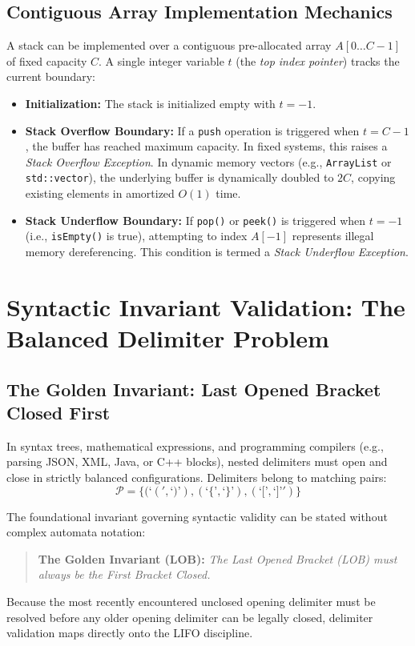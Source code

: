\documentclass[10pt,journal,compsoc,onecolumn]{IEEEtran}
\begin{document}
\subsection{Contiguous Array Implementation Mechanics}

A stack can be implemented over a contiguous pre-allocated array $A[0 \dots C-1]$ of fixed capacity $C$. A single integer variable $t$ (the \emph{top index pointer}) tracks the current boundary:
\begin{itemize}
    \item \textbf{Initialization:} The stack is initialized empty with $t = -1$.
    \item \textbf{Stack Overflow Boundary:} If a \texttt{push} operation is triggered when $t = C - 1$, the buffer has reached maximum capacity. In fixed systems, this raises a \emph{Stack Overflow Exception}. In dynamic memory vectors (e.g., \texttt{ArrayList} or \texttt{std::vector}), the underlying buffer is dynamically doubled to $2C$, copying existing elements in amortized $O(1)$ time.
    \item \textbf{Stack Underflow Boundary:} If \texttt{pop()} or \texttt{peek()} is triggered when $t = -1$ (i.e., \texttt{isEmpty()} is true), attempting to index $A[-1]$ represents illegal memory dereferencing. This condition is termed a \emph{Stack Underflow Exception}.
\end{itemize}

\section{Syntactic Invariant Validation: The Balanced Delimiter Problem}
\label{sec:parentheses}

\subsection{The Golden Invariant: Last Opened Bracket Closed First}

In syntax trees, mathematical expressions, and programming compilers (e.g., parsing JSON, XML, Java, or C++ blocks), nested delimiters must open and close in strictly balanced configurations. Delimiters belong to matching pairs:
\[
\mathcal{P} = \{ ( \text{`}(' , \text{`)'} ), ( \text{`\{'} , \text{`\}'} ), ( \text{`['} , \text{`]'}' ) \}
\]

The foundational invariant governing syntactic validity can be stated without complex automata notation:
\begin{quote}
\textbf{The Golden Invariant (LOB):} \emph{The Last Opened Bracket (LOB) must always be the First Bracket Closed.}
\end{quote}
Because the most recently encountered unclosed opening delimiter must be resolved before any older opening delimiter can be legally closed, delimiter validation maps directly onto the LIFO discipline.
\end{document}
